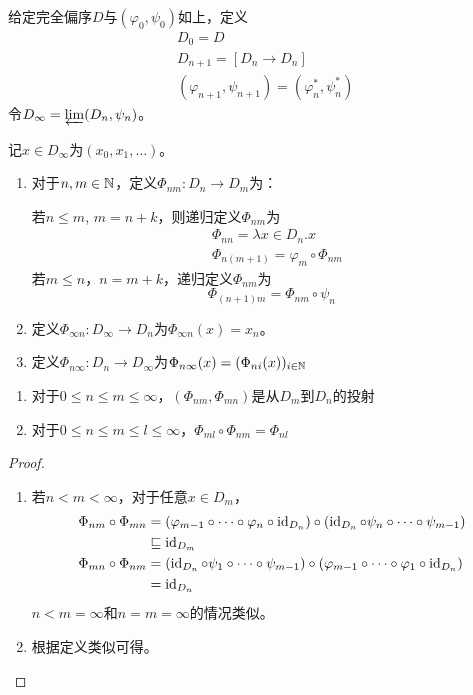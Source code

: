\documentclass[11pt]{article}
\begin{document}
\begin{definition}[构造\(D_\infty\)]
给定完全偏序\(D\)与\((\varphi_0,\psi_0)\)如上，定义
\begin{align*}
&D_0=D\\
&D_{n+1}=[D_n\to D_n]\\
&(\varphi_{n+1},\psi_{n+1})=(\varphi_n^*,\psi_n^*)
\end{align*}
令\(D_\infty=\varprojlim(D_n,\psi_n)\)。
\end{definition}


记\(x\in D_\infty\)为\((x_0,x_1,\dots)\)。

\begin{definition}[]
\begin{enumerate}
\item 对于\(n,m\in\mathbb{N}\)，定义\(\Phi_{nm}:D_n\to D_m\)为：

若\(n\le m\), \(m=n+k\)，则递归定义\(\Phi_{nm}\)为
\begin{align*}
&\Phi_{nn}=\lambda x\in D_n.x\\
&\Phi_{n(m+1)}=\varphi_m\circ\Phi_{nm}
\end{align*}
若\(m\le n\)，\(n=m+k\)，递归定义\(\Phi_{nm}\)为
\begin{equation*}
\Phi_{(n+1)m}=\Phi_{nm}\circ\psi_n
\end{equation*}
\item 定义\(\Phi_{\infty n}:D_\infty\to D_n\)为\(\Phi_{\infty n}(x)=x_n\)。
\item 定义\(\Phi_{n\infty}:D_n\to D_\infty\)为\(\Phi_{n\infty}(x)=(\Phi_{ni}(x))_{i\in\mathbb{N}}\)
\end{enumerate}
\end{definition}

\begin{lemma}[]
\begin{enumerate}
\item 对于\(0\le n\le m\le\infty\)，\((\Phi_{nm},\Phi_{mn})\)是从\(D_m\)到\(D_n\)的投射
\item 对于\(0\le n\le m\le l\le\infty\)，\(\Phi_{ml}\circ\Phi_{nm}=\Phi_{nl}\)
\end{enumerate}
\end{lemma}

\begin{proof}
\begin{enumerate}
\item 若\(n<m<\infty\)，对于任意\(x\in D_m\)，
\begin{align*}
\Phi_{nm}\circ\Phi_{mn}&=(\varphi_{m-1}\circ\dots\circ\varphi_n\circ\operatorname{id}_{D_n})\circ(\operatorname{id}_{D_n}\circ\psi_n\circ\dots\circ\psi_{m-1})\\
&\sqsubseteq\operatorname{id}_{D_m}\\
\Phi_{mn}\circ\Phi_{nm}&=(\operatorname{id}_{D_n}\circ\psi_1\circ\dots\circ\psi_{m-1})\circ(\varphi_{m-1}\circ\dots\circ\varphi_1\circ\operatorname{id}_{D_n})\\
&=\operatorname{id}_{D_n}
\end{align*}
\(n<m=\infty\)和\(n=m=\infty\)的情况类似。
\item 根据定义类似可得。
\end{enumerate}
\end{proof}
\end{document}

